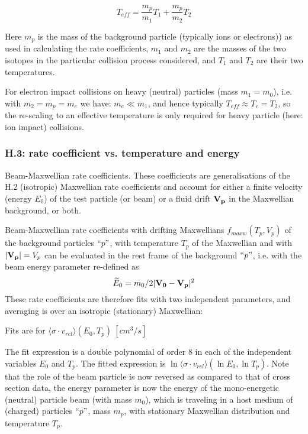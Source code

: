 \documentclass[12pt,dvipdfmx]{article}
\begin{document}
\begin{equation}\label{rescale}
T_{eff} = \frac {m_p}{m_1} T_1 + \frac{m_p}{m_2} T_2
\end{equation}

Here $m_p$ is the mass of the background particle (typically ions or electrons)) as used in calculating the rate coefficients,
$m_1$ and $m_2$ are the masses of the two isotopes in the particular collision
process considered, and $T_1$ and $T_2$ are their two temperatures.

For electron impact collisions on heavy (neutral) particles (mass $m_1=m_0$), i.e. with $m_2 =m_p = m_e$  we have:  $m_e \ll m_1$, and hence
typically $T_{eff} \approx T_e = T_2$, so the re-scaling to an effective temperature is only required for heavy particle (here: ion impact) collisions.

\subsubsection{H.3: rate coefficient vs. temperature and energy}\label{sec1.3.3}
Beam-Maxwellian rate coefficients. These coefficients are generalisations of the H.2 (isotropic) Maxwellian rate coefficients and account for either
a finite velocity (energy $E_0$) of the  test particle (or beam) or a fluid drift ${\bf V_p}$ in the Maxwellian background, or both.

Beam-Maxwellian rate coefficients with drifting Maxwellians $f_{maxw}(T_p,V_p)$ of the background particles $``p"$, with temperature $T_p$ of the
Maxwellian and with $|{\bf V_p}|= V_p$ can be evaluated in the
rest frame of the background $``p"$, i.e. with the beam energy parameter re-defined as
\begin{equation}\label{E0rest}
\widetilde{E}_0=m_0/2|{\bf V_0}-{\bf V_p}|^2
\end{equation}
These rate coefficients are
therefore fits with two independent parameters, and averaging is over an isotropic (stationary) Maxwellian:

Fits are for $\langle\sigma \cdot v_{rel}  \rangle (E_0,T_p) \ [cm^3/s]$

The fit expression is a double polynomial of order 8  in each of the independent variables
$E_0$ and $T_p$. The fitted expression is $\ln\langle\sigma \cdot v_{rel}  \rangle (\ln{E_0},\ln{T_p})$.
Note that the role of the beam particle is now reversed as compared to that of cross section data,
the energy parameter is now the energy of the mono-energetic (neutral) particle beam (with mass $m_0$), which is traveling in a host medium
of (charged) particles $``p"$, mass $m_p$, with stationary Maxwellian distribution and temperature $T_p$.
\end{document}
